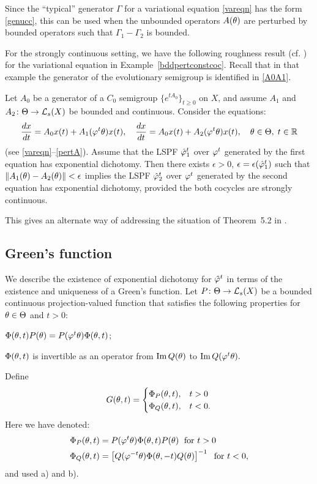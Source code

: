 Since the ``typical'' generator $\Gamma$ for a variational equation
\eqref{vareqn} has the form \eqref{genucc}, this can be used when
the unbounded operators $A(\theta)$ are perturbed by  bounded operators
such that $\Gamma_1-\Gamma_2$ is bounded.

For the strongly continuous setting, we have the following
 roughness result (cf. \cite{Palm2}) for the variational equation in
Example~\ref{bddpertconstcoc}. Recall that in that example the
generator of the evolutionary semigroup is identified in
\eqref{A0A1}.

\begin{cor}  Let $A_0$ be a generator of a $C_0$ semigroup
$\{e^{tA_0}\}_{t\ge0}$ on $X$, and assume
$A_1$ and $A_2\colon \Theta\to {\cal{L}}_s(X)$ be bounded and
continuous. Consider the equations:
\[
\dfrac{dx}{dt}=A_0x(t)+A_1(\varphi^t\theta)x(t),\quad
\dfrac{dx}{dt}=A_0x(t)+A_2(\varphi^t\theta)x(t), \quad \theta\in \Theta,\;
t\in{\Bbb{R}} \]
(see \eqref{vareqn}--\eqref{pertA}). Assume that the LSPF ${\hat{\varphi}}_1^t$ over
$\varphi^t$ generated by the first equation has exponential dichotomy.
Then there exists $\epsilon>0$, $\epsilon=\epsilon({\hat{\varphi}}_1^t)$ such that
$\|A_1(\theta)-A_2(\theta)\|<\epsilon$ implies the LSPF ${\hat{\varphi}}_2^t$ over
$\varphi^t$ generated by the second equation has exponential dichotomy,
provided the both cocycles are strongly continuous. \end{cor}

This gives an alternate way of addressing the situation of Theorem~5.2
in \cite{ChLe1}.

\subsection{Green's function}

We describe the existence of
exponential dichotomy for ${\hat{\varphi}}^t$ in terms of the existence and
uniqueness of a Green's function. Let $P\colon \Theta\to {\cal{L}}_s(X)$
be a bounded continuous projection-valued function that satisfies
the following properties for  $\theta\in \Theta$ and $t>0$:
\begin{list}{)}{}
\item $\Phi(\theta,t)P(\theta) = P(\varphi^t\theta) \Phi(\theta,t)$;
\item $\Phi(\theta,t)$ is invertible as an operator from
      $\operatorname{Im} Q(\theta)$ to $\operatorname{Im} Q(\varphi^t\theta).$
\end{list}
Define
\begin{equation}\lb{Gxt}
G(\th,t)=
\begin{cases}
   \Phi_P(\th,t), & t>0\\
   \Phi_Q(\th,t), & t<0.
\end{cases}
\end{equation}
Here we have denoted:
\begin{align*}
\Phi_P(\theta,t)  &= P(\varphi^t\theta) \Phi(\theta,t) P(\theta)\; \text{ for } t>0\\
\Phi_Q(\theta,t) &= \left[Q(\varphi^{-t}\theta) \Phi(\theta,-t) Q(\theta)\right]^{-1}
\;\text{ for } t<0,
\end{align*}
and used a) and b).


